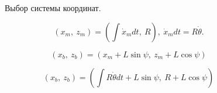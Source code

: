\documentclass[12pt,a4paper,openany]{extarticle}
\begin{document}
\begin{figure}[H]
	\noindent{}
	\caption{Выбор системы координат.}
	\label{fig1}
\end{figure}


\begin{equation}
(x_m,\ z_m)=(\int\dot{x}_mdt,\ R),\ 
\dot{x}_mdt=R
\dot{\theta}.
\end{equation}

\begin{equation}
(x_b,\ z_b)=\left(x_m+L\sin\psi ,\ z_m+L\cos\psi \right)
\end{equation}

\begin{equation}
(x_b,\ z_b)=\left(\int R\dot{\theta} dt+L\sin\psi,\ R+L\cos\psi \right)
\end{equation}
\end{document}
